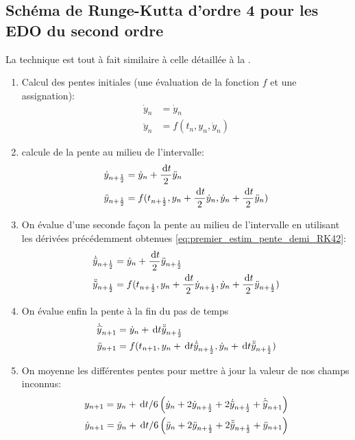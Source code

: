 \documentclass[10pt]{book}
\begin{document}
\begin{appendices}
\subsection{Schéma de Runge-Kutta d'ordre 4 pour les EDO du second ordre}
La technique est tout à fait similaire à celle détaillée à la .
\begin{enumerate}
\item Calcul des pentes initiales (une évaluation de la fonction $f$ et une assignation):
$$\begin{aligned}
\dot{y}_{n} &= \dot{y}_{n}\\
\ddot{y}_{n} &=  f(t_{n}, y_{n},\dot{y}_{n})
\end{aligned}$$
\item calcule de la pente au milieu de l'intervalle:
\begin{equation}
\begin{aligned}
\dot{y}_{n+\frac{1}{2}} &= \dot{y}_{n}+\frac{\,\mathrm{d}t}{2}\ddot{y}_{n}\\
\ddot{y}_{n+\frac{1}{2}} &= f(t_{n+\frac{1}{2}},y_{n}+\frac{\,\mathrm{d}t}{2}\dot{y}_{n},\dot{y}_{n}+\frac{\,\mathrm{d}t}{2}\ddot{y}_{n})
\end{aligned}
\label{eq:premier_estim_pente_demi_RK42}
\end{equation}
\item On évalue d'une seconde façon la pente au milieu de l'intervalle en utilisant les dérivées précédemment obtenues \eqref{eq:premier_estim_pente_demi_RK42}:
$$\begin{aligned}
\dot{\tilde{y}}_{n+\frac{1}{2}} &= \dot{y}_{n}+\frac{\,\mathrm{d}t}{2}\ddot{y}_{n+\frac{1}{2}}\\
\ddot{\tilde{y}}_{n+\frac{1}{2}} &= f(t_{n+\frac{1}{2}},y_{n}+\frac{\,\mathrm{d}t}{2}\dot{y}_{n+\frac{1}{2}},\dot{y}_{n}+\frac{\,\mathrm{d}t}{2}\ddot{y}_{n+\frac{1}{2}})
\end{aligned}$$
\item On évalue enfin la pente à la fin du pas de temps
$$\begin{aligned}
\dot{\widehat{y}}_{n+1} &= \dot{y}_{n}+\,\mathrm{d}t\ddot{\tilde{y}}_{n+\frac{1}{2}}\\
\ddot{y}_{n+1} &= f(t_{n+1},y_{n}+\,\mathrm{d}t\dot{\tilde{y}}_{n+\frac{1}{2}},\dot{y}_{n}+\,\mathrm{d}t\ddot{\tilde{y}}_{n+\frac{1}{2}})\\
\end{aligned}$$
\item On moyenne les différentes pentes pour mettre à jour la valeur de nos champs inconnus:
$$\begin{aligned}
y_{n+1} = y_{n}+\,\mathrm{d}t/6\left(\dot{y}_{n}+2\dot{y}_{n+\frac{1}{2}}+2\dot{\tilde{y}}_{n+\frac{1}{2}}+\dot{\widehat{y}}_{n+1}\right)\\
\dot{y}_{n+1} = \dot{y}_{n}+\,\mathrm{d}t/6\left(\ddot{y}_{n}+2\ddot{y}_{n+\frac{1}{2}}+2\ddot{\tilde{y}}_{n+\frac{1}{2}}+\ddot{y}_{n+1}\right)\\
\end{aligned}$$
\end{enumerate}
\end{appendices}

\end{document}

